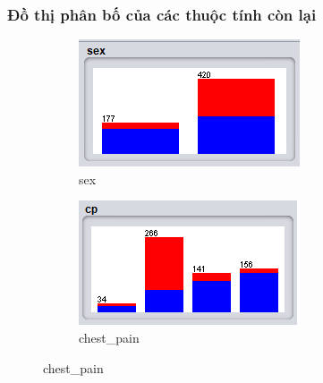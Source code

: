 \subsubsection{Đồ thị phân bố của các thuộc tính còn lại}
\begin{figure}[H]
    \centering %
   \begin{subfigure}{0.38\textwidth}
  \includegraphics[width=\linewidth]{2/4.png}
  \caption{sex}
  \label{fig:1}
\end{subfigure}\hfil %
\begin{subfigure}{0.38\textwidth}
  \includegraphics[width=\linewidth]{2/5.png}
  \caption{chest\_pain}
  \label{fig:3}
\end{subfigure}


\end{figure}
